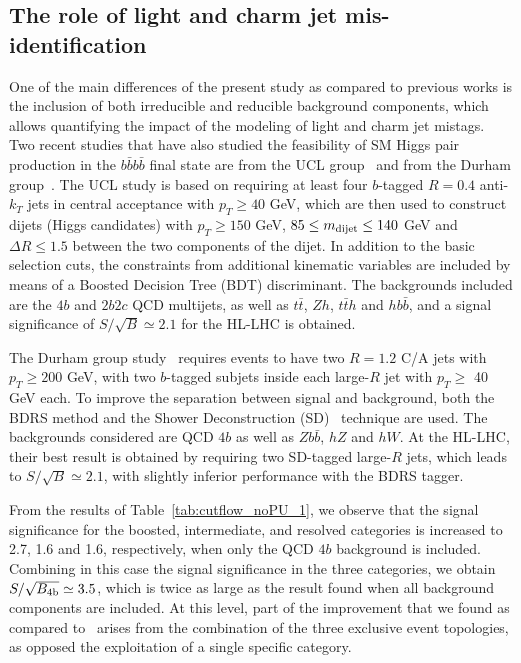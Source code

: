 \subsection{The role of light  and charm jet mis-identification}

One of the main differences of the present study as compared
to previous works is the inclusion of both irreducible
and reducible background components, which allows
quantifying
the impact of the modeling of light and charm jet mistags. 
%
Two recent studies that have also studied the
feasibility of SM Higgs pair production in the $b\bar{b}b\bar{b}$
final state are from the UCL group~\cite{Wardrope:2014kya} and from
the
Durham group~\cite{deLima:2014dta}.
%
The UCL study is based
on requiring at least four $b$-tagged $R=0.4$ anti-$k_T$ jets
in central acceptance with $p_T \ge 40$ GeV, which are
then used to construct dijets (Higgs candidates) with
$p_T \ge 150$ GeV, $85 \le m_{\rm dijet} \le 140$ GeV
and $\Delta R \le 1.5$ between the two components
of the dijet.
%
In addition to the basic selection cuts, the constraints
from additional kinematic variables are included by means of a 
Boosted Decision Tree (BDT) discriminant.
%
The backgrounds included are the $4b$ and
$2b2c$ QCD multijets, as well as
$t\bar{t}$, $Zh$, $t\bar{t}h$ and $hb\bar{b}$,
and a signal significance of $S/\sqrt{B}\simeq 2.1$ for the HL-LHC
is obtained.

The Durham group study~\cite{deLima:2014dta} requires events
to have two $R=1.2$ C/A jets with $p_T\ge 200$ GeV, with
two $b$-tagged subjets inside each large-$R$ jet with
$p_T \ge$ 40 GeV each.
%
To improve the separation between
signal and background, both the BDRS
method and the Shower Deconstruction (SD)~\cite{Soper:2011cr,Soper:2012pb}
technique are used.
%
The backgrounds considered are QCD $4b$ as well as $Zb\bar{b}$, $hZ$ and
$hW$.
%
At the HL-LHC, their best result is obtained by requiring two
SD-tagged large-$R$ jets, which leads to $S/\sqrt{B}\simeq 2.1$, with
 slightly inferior performance with the BDRS tagger.
 
 From the results of Table~\ref{tab:cutflow_noPU_1}, we observe
 that the signal significance for the boosted, intermediate,
 and resolved categories is increased to 2.7, 1.6 and 1.6, respectively,
 when only the QCD $4b$ background is included.
 Combining in this
 case the signal significance in the three categories,
 we
 obtain $S/\sqrt{B_{\rm 4b}}\simeq 3.5$, which is twice
 as large as the result found when
 all background components are included.
 At this level, part of the improvement that we found as compared
 to~\cite{deLima:2014dta,Wardrope:2014kya} arises
 from the combination of the three exclusive event topologies,
 as opposed the exploitation of a single specific category.
 

